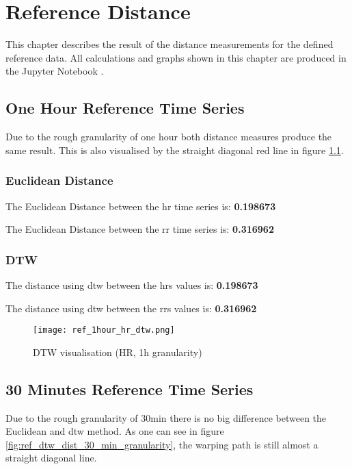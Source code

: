 \chapter{Reference Distance}

This chapter describes the result of the distance measurements for the defined reference data. All calculations and graphs shown in this chapter are produced in the Jupyter Notebook 
\newline {}.

\section{One Hour Reference Time Series}

Due to the rough granularity of one hour both distance measures produce the same result. This is also visualised by the straight diagonal red line in figure \ref{fig:ref_dtw_dist_one_h_granularity}.

\subsection{Euclidean Distance}

The Euclidean Distance between the \ac{hr} time series is: \textbf{0.198673}


The Euclidean Distance between the \ac{rr} time series is: \textbf{0.316962}


\subsection{DTW}

The distance using \ac{dtw} between the \acp{hr} values is: \textbf{0.198673}


The distance using \ac{dtw} between the \acp{rr} values is: \textbf{0.316962}

\begin{figure}[h!]
	\texttt{[image: ref\_1hour\_hr\_dtw.png]}
	\caption{DTW visualisation (HR, 1h granularity)}
	\label{fig:ref_dtw_dist_one_h_granularity}
\end{figure}




\clearpage
\section{30 Minutes Reference Time Series}

Due to the rough granularity of 30min there is no big difference between the Euclidean and \ac{dtw} method. As one can see in figure \ref{fig:ref_dtw_dist_30_min_granularity}, the warping path is still almost a straight diagonal line.

